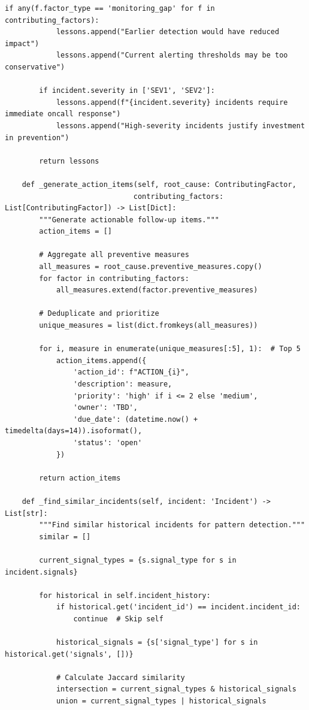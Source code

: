 \begin{lstlisting}[style=python, caption={Post-incident analysis with root cause identification}]
        if any(f.factor_type == 'monitoring_gap' for f in contributing_factors):
            lessons.append("Earlier detection would have reduced impact")
            lessons.append("Current alerting thresholds may be too conservative")

        if incident.severity in ['SEV1', 'SEV2']:
            lessons.append(f"{incident.severity} incidents require immediate oncall response")
            lessons.append("High-severity incidents justify investment in prevention")

        return lessons

    def _generate_action_items(self, root_cause: ContributingFactor,
                              contributing_factors: List[ContributingFactor]) -> List[Dict]:
        """Generate actionable follow-up items."""
        action_items = []

        # Aggregate all preventive measures
        all_measures = root_cause.preventive_measures.copy()
        for factor in contributing_factors:
            all_measures.extend(factor.preventive_measures)

        # Deduplicate and prioritize
        unique_measures = list(dict.fromkeys(all_measures))

        for i, measure in enumerate(unique_measures[:5], 1):  # Top 5
            action_items.append({
                'action_id': f"ACTION_{i}",
                'description': measure,
                'priority': 'high' if i <= 2 else 'medium',
                'owner': 'TBD',
                'due_date': (datetime.now() + timedelta(days=14)).isoformat(),
                'status': 'open'
            })

        return action_items

    def _find_similar_incidents(self, incident: 'Incident') -> List[str]:
        """Find similar historical incidents for pattern detection."""
        similar = []

        current_signal_types = {s.signal_type for s in incident.signals}

        for historical in self.incident_history:
            if historical.get('incident_id') == incident.incident_id:
                continue  # Skip self

            historical_signals = {s['signal_type'] for s in historical.get('signals', [])}

            # Calculate Jaccard similarity
            intersection = current_signal_types & historical_signals
            union = current_signal_types | historical_signals


\end{lstlisting}
